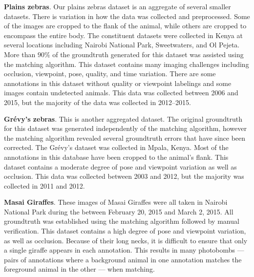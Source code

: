         \begin{itemln}
            \item \textbf{Plains zebras}.
            Our plains zebras dataset is an aggregate of several smaller datasets.
            There is variation in how the data was collected and preprocessed.
            Some of the images are cropped to the flank of the animal, while others are cropped to encompass the
              entire body.
            The constituent datasets were collected in Kenya at several locations including Nairobi National
              Park, Sweetwaters, and Ol Pejeta.
            More than $90\percent$ of the groundtruth generated for this dataset was assisted using the matching
              algorithm.
            This dataset contains many imaging challenges including occlusion, viewpoint, pose, quality, and time
              variation.
            There are some annotations in this dataset without quality or viewpoint labelings and some images
              contain undetected animals.
            This data was collected between 2006 and 2015, but the majority of the data was collected in
              2012--2015.

            \item \textbf{Grévy's zebras}.
            This is another aggregated dataset.
            The original groundtruth for this dataset was generated independently of the matching algorithm,
              however the matching algorithm revealed several groundtruth errors that have since been corrected.
            The Grévy's dataset was collected in Mpala, Kenya.
            Most of the annotations in this database have been cropped to the animal's flank.
            This dataset contains a moderate degree of pose and viewpoint variation as well as occlusion.
            This data was collected between 2003 and 2012, but the majority was collected in 2011 and 2012.

            \item \textbf{Masai Giraffes}.
            These images of Masai Giraffes were all taken in Nairobi National Park during the \GZC{} between
              February 20, 2015 and March 2, 2015.
            All groundtruth was established using the matching algorithm followed by manual verification.
            This dataset contains a high degree of pose and viewpoint variation, as well as occlusion.
            Because of their long necks, it is difficult to ensure that only a single giraffe appears in each
              annotation.
            This results in many photobombs  --- pairs of annotations where a background
              animal in one annotation matches the foreground animal in the other --- when matching.
        \end{itemln}

